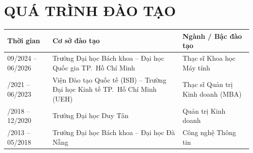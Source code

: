 \clearpage

\section*{QUÁ TRÌNH ĐÀO TẠO}

\vspace{0.5em}

\noindent
\begin{tabular}{@{}p{2.6cm}p{6.4cm}p{5.2cm}@{}}
\toprule
\textbf{Thời gian} & \textbf{Cơ sở đào tạo} & \textbf{Ngành / Bậc đào tạo} \\
\midrule
09/2024 -- 06/2026 & Trường Đại học Bách khoa -- Đại học Quốc gia TP.\ Hồ Chí Minh & Thạc sĩ Khoa học Máy tính \\
\addlinespace
06/2021 -- 06/2023 & Viện Đào tạo Quốc tế (ISB) -- Trường Đại học Kinh tế TP.\ Hồ Chí Minh (UEH) & Thạc sĩ Quản trị Kinh doanh (MBA)\\
\addlinespace
06/2018 -- 12/2020 & Trường Đại học Duy Tân & Quản trị Kinh doanh\\
\addlinespace
10/2013 -- 05/2018 & Trường Đại học Bách khoa -- Đại học Đà Nẵng & Công nghệ Thông tin\\
\bottomrule
\end{tabular}
